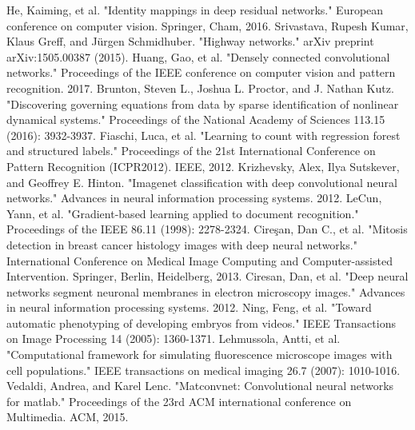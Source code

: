 \documentclass[conference]{IEEEtran}
\begin{document}
\begin{thebibliography}{00}
 He, Kaiming, et al. "Identity mappings in deep residual networks." European conference on computer vision. Springer, Cham, 2016.
 Srivastava, Rupesh Kumar, Klaus Greff, and Jürgen Schmidhuber. "Highway networks." arXiv preprint arXiv:1505.00387 (2015).
 Huang, Gao, et al. "Densely connected convolutional networks." Proceedings of the IEEE conference on computer vision and pattern recognition. 2017.
 Brunton, Steven L., Joshua L. Proctor, and J. Nathan Kutz. "Discovering governing equations from data by sparse identification of nonlinear dynamical systems." Proceedings of the National Academy of Sciences 113.15 (2016): 3932-3937.
 Fiaschi, Luca, et al. "Learning to count with regression forest and structured labels." Proceedings of the 21st International Conference on Pattern Recognition (ICPR2012). IEEE, 2012.
Krizhevsky, Alex, Ilya Sutskever, and Geoffrey E. Hinton. "Imagenet classification with deep convolutional neural networks." Advances in neural information processing systems. 2012.
 LeCun, Yann, et al. "Gradient-based learning applied to document recognition." Proceedings of the IEEE 86.11 (1998): 2278-2324.
 Cireşan, Dan C., et al. "Mitosis detection in breast cancer histology images with deep neural networks." International Conference on Medical Image Computing and Computer-assisted Intervention. Springer, Berlin, Heidelberg, 2013.
 Ciresan, Dan, et al. "Deep neural networks segment neuronal membranes in electron microscopy images." Advances in neural information processing systems. 2012.
 Ning, Feng, et al. "Toward automatic phenotyping of developing embryos from videos." IEEE Transactions on Image Processing 14 (2005): 1360-1371.
 Lehmussola, Antti, et al. "Computational framework for simulating fluorescence microscope images with cell populations." IEEE transactions on medical imaging 26.7 (2007): 1010-1016.
 Vedaldi, Andrea, and Karel Lenc. "Matconvnet: Convolutional neural networks for matlab." Proceedings of the 23rd ACM international conference on Multimedia. ACM, 2015.

\end{thebibliography}
\end{document}

